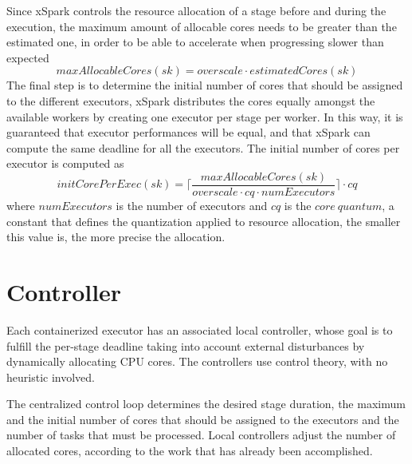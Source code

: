 Since xSpark controls the resource allocation of a stage before
and during the execution, the maximum amount of allocable cores
needs to be greater than the estimated one, in order to be able to
accelerate when progressing slower than expected
\[maxAllocableCores(sk) = overscale \cdot estimatedCores(sk)\]
The final step is to determine the initial number of cores that should
be assigned to the different executors, xSpark distributes the cores
equally amongst the available workers by creating one executor per
stage per worker. In this way, it is guaranteed that executor performances
will be equal, and that xSpark can compute the same deadline
for all the executors. The initial number of cores per executor is
computed as
\[initCorePerExec(sk) = \lceil\dfrac {maxAllocableCores(sk)}{overscale \cdot cq \cdot numExecutors}\rceil\cdot cq\]
where $numExecutors$ is the number of executors and $cq$ is the $core\ 
quantum$, a constant that defines the quantization applied to resource
allocation, the smaller this value is, the more precise the allocation.

\section{Controller}\label{subsec:controller}
Each containerized executor has an associated local controller, whose
goal is to fulfill the per-stage deadline taking into account external
disturbances by dynamically allocating CPU cores. The controllers
use control theory, with no heuristic involved.

The centralized control loop determines the desired stage duration,
the maximum and the initial number of cores that should be assigned
to the executors and the number of tasks that must be processed.
Local controllers adjust the number of allocated cores, according to
the work that has already been accomplished.

